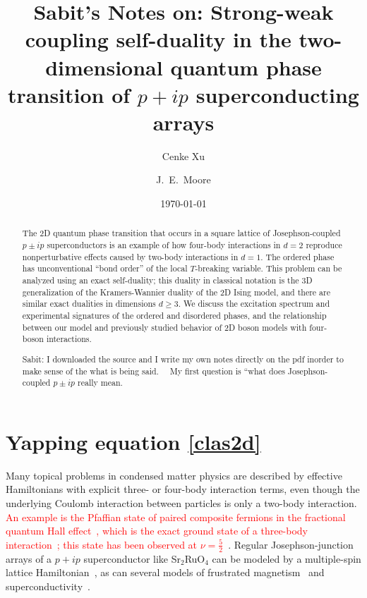 \documentclass[prl,twocolumn,showpacs,superscriptaddress,preprintnumbers,amssymb]{revtex4}
\begin{document}
\title{Sabit's Notes on: Strong-weak coupling self-duality in the two-dimensional quantum phase transition of $p+ip$ superconducting arrays}
\author{Cenke Xu}
\author{J.~E.~Moore}
\date{\today}
\begin{abstract}
The 2D quantum phase transition that occurs in a square lattice of
Josephson-coupled $p \pm ip$ superconductors is an example of how four-body interactions in $d=2$ reproduce nonperturbative effects caused by two-body interactions in $d=1$.  The ordered phase has unconventional ``bond order'' of the
local $T$-breaking variable.  This problem can be analyzed
using an exact self-duality; this duality in classical notation is
the 3D generalization of the Kramers-Wannier duality of the 2D Ising model,
and there are similar exact dualities in dimensions $d \geq 3$.  We discuss the excitation spectrum and experimental signatures of the ordered and disordered phases,
and the relationship between our model and previously studied behavior of 2D boson models with four-boson interactions.

\textsf{
Sabit: I downloaded the source and I write my own notes directly on the pdf inorder to make sense of the what is being said. 
\
\
My first question is ``what does Josephson-coupled $p \pm ip$ really mean.}
\end{abstract}
\maketitle



\section*{Yapping equation \ref{clas2d}}
Many topical problems in condensed matter physics are described by
effective Hamiltonians with explicit three- or four-body
interaction terms, even though the underlying Coulomb interaction
between particles is only a two-body interaction.  \textcolor{red}{An example is
the Pfaffian state of paired composite fermions in the fractional
quantum Hall effect~\cite{mooreread}, which is the exact ground
state of a three-body interaction~\cite{greiter}; this state has
been observed at $\nu=\frac{5}{2}$~\cite{willett}}.  Regular
Josephson-junction arrays of a $p+ip$ superconductor like
Sr$_2$RuO$_4$ can be modeled by a multiple-spin lattice
Hamiltonian~\cite{moorelee}, as can several models of frustrated
magnetism~\cite{hermele} and superconductivity~\cite{paramekanti}.
\end{document}
